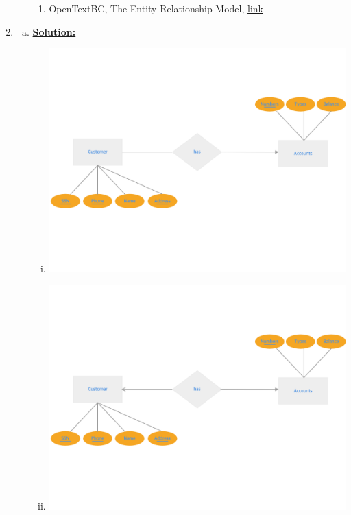 \documentclass[12pt]{article}
\begin{document}
\begin{enumerate}[1.]
\begin{enumerate}[a)]
        \bigskip

        \begin{enumerate}[1)]
            \item OpenTextBC, The Entity Relationship Model, \href{https://opentextbc.ca/dbdesign01/chapter/chapter-8-entity-relationship-model/}{link}
        \end{enumerate}
    \end{enumerate}

    \item

    \begin{enumerate}[a)]
        \item

        \underline{\textbf{Solution:}}

        \bigskip

        \begin{enumerate}[i)]

            \item

            \begin{center}
            \includegraphics[width=0.7\linewidth]{images/worksheet_14_solution_46.png}
            \end{center}

            \item

            \begin{center}
            \includegraphics[width=0.7\linewidth]{images/worksheet_14_solution_47.png}
            \end{center}


\end{enumerate}
\end{enumerate}
\end{enumerate}
\end{document}
